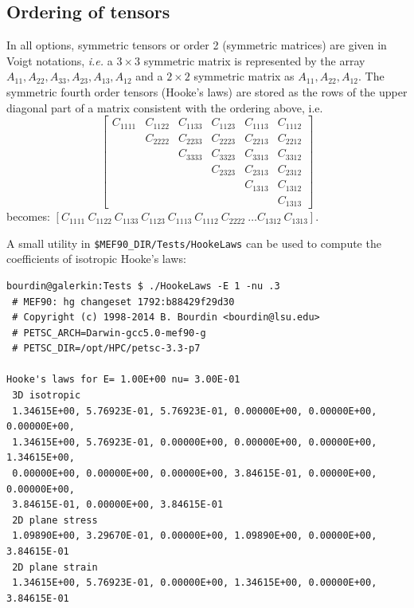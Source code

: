 \documentclass[10pt,oneside]{report}
\begin{document}
\subsection{Ordering of tensors}
In all options, symmetric tensors or order 2 (symmetric matrices) are given in Voigt notations, \emph{i.e.} a $3\times 3$ symmetric matrix is represented by the array $A_{11},A_{22},A_{33},A_{23},A_{13},A_{12}$ and a $2\times 2$ symmetric matrix as $A_{11},A_{22},A_{12}$. 
The symmetric fourth order tensors (Hooke's laws) are stored as the rows of the upper diagonal part of a matrix consistent with the ordering above, i.e.
\begin{equation*}
	\begin{bmatrix}
		C_{1111} & C_{1122} & C_{1133} & C_{1123} & C_{1113} & C_{1112}\\
				 & C_{2222} & C_{2233} & C_{2223} & C_{2213} & C_{2212}\\
				 &          & C_{3333} & C_{3323} & C_{3313} & C_{3312}\\
				 &          &          & C_{2323} & C_{2313} & C_{2312}\\
				 &          &          &          & C_{1313} & C_{1312}\\
				 &          &          &          &          & C_{1313}
	\end{bmatrix}
\end{equation*}
becomes:
$\left[C_{1111}\ C_{1122}\  C_{1133}\  C_{1123}\  C_{1113}\  C_{1112}\  C_{2222}\  \dots  C_{1312}\  C_{1313}\right]$.

A small utility in \verb+$MEF90_DIR/Tests/HookeLaws+ can be used to compute the coefficients of isotropic Hooke's laws:
\begin{Verbatim}
bourdin@galerkin:Tests $ ./HookeLaws -E 1 -nu .3
 # MEF90: hg changeset 1792:b88429f29d30 
 # Copyright (c) 1998-2014 B. Bourdin <bourdin@lsu.edu> 
 # PETSC_ARCH=Darwin-gcc5.0-mef90-g 
 # PETSC_DIR=/opt/HPC/petsc-3.3-p7 
  
Hooke's laws for E= 1.00E+00 nu= 3.00E-01
 3D isotropic
 1.34615E+00, 5.76923E-01, 5.76923E-01, 0.00000E+00, 0.00000E+00, 0.00000E+00, 
 1.34615E+00, 5.76923E-01, 0.00000E+00, 0.00000E+00, 0.00000E+00, 1.34615E+00, 
 0.00000E+00, 0.00000E+00, 0.00000E+00, 3.84615E-01, 0.00000E+00, 0.00000E+00, 
 3.84615E-01, 0.00000E+00, 3.84615E-01 
 2D plane stress
 1.09890E+00, 3.29670E-01, 0.00000E+00, 1.09890E+00, 0.00000E+00, 3.84615E-01 
 2D plane strain
 1.34615E+00, 5.76923E-01, 0.00000E+00, 1.34615E+00, 0.00000E+00, 3.84615E-01 
\end{Verbatim}
\end{document}

